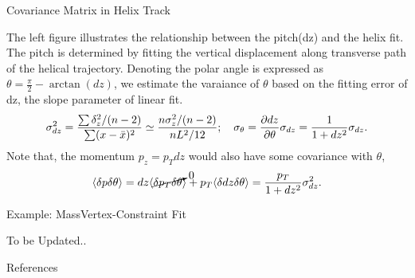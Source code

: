 \documentclass[
	xcolor=dvipsnames,
	10pt, 
	]{beamer}
\begin{document}
\begin{frame}{Covariance Matrix in Helix Track}
	\begin{block}{}
		{
			The left figure illustrates the relationship between the pitch(dz) and the helix fit. The pitch is determined by fitting the vertical displacement along transverse path of the helical trajectory. Denoting the polar angle is expressed as 
		}
$\theta = \frac{\pi}{2}-\arctan(dz)$, we estimate the varaiance of $\theta$ based on the fitting error of dz, the slope parameter of linear fit.
		\begin{align*}
			\sigma_{dz}^2 =\frac{\sum\delta_z^2/(n-2) }{\sum(x-\bar x)^2} \simeq \frac{n \sigma_z^2/(n-2)}{n L^2/12};\quad \sigma_\theta = \frac{\partial dz}{\partial \theta}\sigma_{dz}=\frac{1}{1+dz^2}\sigma_{dz}.
		\end{align*}
		Note that, the momentum $p_z=p_T dz$ would also have some covariance with $\theta$,
		\begin{align*}
			\langle \delta p\delta \theta\rangle = dz\langle  \cancelto{0}{\delta p_T  \delta \theta}\rangle+	p_T\langle \delta dz \delta \theta\rangle =\frac{p_T}{1+dz^2}\sigma_{dz}^2.
		\end{align*}
	
	\end{block}
\end{frame}
\begin{frame}{Example: MassVertex-Constraint Fit}
	\begin{block}{}
To be Updated..
	\end{block}
\end{frame}
\begin{frame}{References}
	 	\printbibliography
\end{frame}
\end{document}
